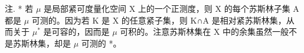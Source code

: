 注. * 若 \(\mu\) 是局部紧可度量化空间 X 上的一个正测度，则 X 的每个苏斯林子集 A 都是 \(\mu\) 可测的。因为若 K 是 X 的任意紧子集，则 K∩A 是相对紧苏斯林集，从而关于 \(\mu^{*}\) 是可容的，因而是 \(\mu\) 可积的。注意苏斯林集在 X 中的余集虽然一般不是苏斯林集，却是 \(\mu\) 可测的 *。

\appendix
\setcounter{chapter}{9}
\renewcommand{\thechapter}{\Roman{chapter}}
\setcounter{subsection}{0}
\renewcommand{\thesubsection}{\arabic{subsection}}

